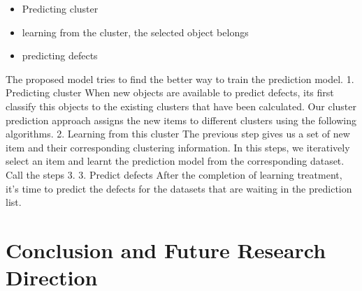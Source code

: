 \documentclass[12pt]{report}
\begin{document}
\begin{itemize}
	\item Predicting cluster
	\item learning from the cluster, the selected object belongs
	\item predicting defects
\end{itemize}
The proposed model tries to find the better way to train the prediction model. 
1.	Predicting cluster
When new objects are available to predict defects, its first classify this objects to the existing clusters that have been calculated. Our cluster prediction approach assigns the new items to different clusters using the following algorithms.  
2.	Learning from this cluster
The previous step gives us a set of new item and their corresponding clustering information. In this steps, we iteratively select an item and learnt the prediction model from the corresponding dataset. Call the steps 3. 
3.	Predict defects
After the completion of learning treatment, it’s time to predict the defects for the datasets that are waiting in the prediction list. 

\chapter{Conclusion and Future Research Direction}


\begin{singlespace}


\end{singlespace}
\end{document}
